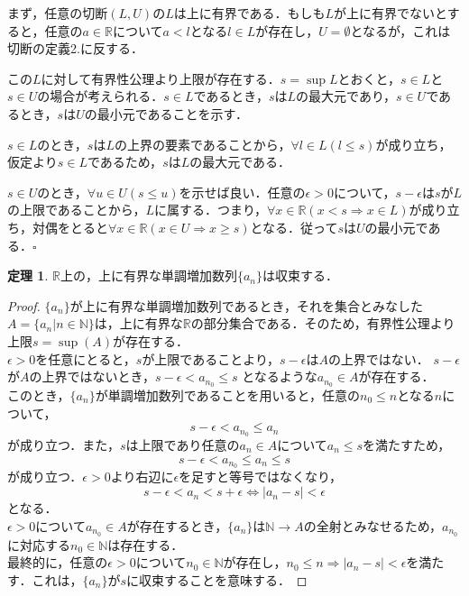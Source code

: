 \documentclass[oneside,openany]{jbook}
\theoremstyle{definition}
\newtheorem{theorem}{定理}
\begin{document}
まず，任意の切断$(L, U)$の$L$は上に有界である．もしも$L$が上に有界でないとすると，任意の$a \in \mathbb{R}$について$a < l$となる$l \in L$が存在し，$U = \emptyset$となるが，これは切断の定義2.に反する．

この$L$に対して有界性公理より上限が存在する．$s = \sup L$とおくと，$s \in L$と$s \in U$の場合が考えられる．$s \in L$であるとき，$s$は$L$の最大元であり，$s \in U$であるとき，$s$は$U$の最小元であることを示す．

$s \in L$のとき，$s$は$L$の上界の要素であることから，$\forall l \in L(l \leq s)$が成り立ち，仮定より$s \in L$であるため，$s$は$L$の最大元である．

$s \in U$のとき，$\forall u \in U(s \leq u)$を示せば良い．任意の$\epsilon > 0$について，$s - \epsilon$は$s$が$L$の上限であることから，$L$に属する．つまり，$\forall x \in \mathbb{R}(x < s \Rightarrow x \in L)$が成り立ち，対偶をとると$\forall x \in \mathbb{R}(x \in U \Rightarrow x \geq s)$となる．従って$s$は$U$の最小元である．$\square$



\begin{theorem}
\label{theorem:monotonic_inc_conv}
$\mathbb{R}上の，$上に有界な単調増加数列$\{ a_{n} \}$は収束する．
\end{theorem}

\begin{proof}
$\{ a_{n} \}$が上に有界な単調増加数列であるとき，それを集合とみなした$A = \{ a_{n} | n \in \mathbb{N}\}$は，上に有界な$\mathbb{R}$の部分集合である．そのため，有界性公理より上限$s = \sup(A)$が存在する． \\
$\epsilon > 0$を任意にとると，$s$が上限であることより，$s-\epsilon$は$A$の上界ではない． $s-\epsilon$が$A$の上界ではないとき，$s-\epsilon < a_{n_{0}} \leq s$ となるような$a_{n_{0}} \in A$が存在する． \\
このとき，$\{ a_{n} \}$が単調増加数列であることを用いると，任意の$n_{0} \leq n$となる$n$について，
$$s-\epsilon < a_{n_{0}} \leq a_{n}$$
が成り立つ．また，$s$は上限であり任意の$a_{n} \in A$について$a_{n} \leq s$を満たすため，
$$s-\epsilon < a_{n_{0}} \leq a_{n} \leq s$$
が成り立つ．$\epsilon > 0$より右辺に$\epsilon$を足すと等号ではなくなり，
$$s-\epsilon<a_{n}< s + \epsilon \iff  | a_{n} - s| < \epsilon$$
となる．\\
$\epsilon > 0$について$a_{n_{0}} \in A$が存在するとき，$\{ a_{n} \}$は$\mathbb{N} \to A$の全射とみなせるため，$a_{n_{0}}$に対応する$n_{0} \in \mathbb{N}$は存在する．\\
最終的に，任意の$\epsilon > 0$について$n_{0} \in \mathbb{N}$が存在し，$n_{0} \leq n \Rightarrow  | a_{n} - s| < \epsilon$を満たす．これは，$\{ a_{n} \}$が$s$に収束することを意味する．
\end{proof}
\end{document}
